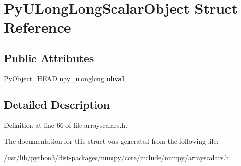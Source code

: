 \hypertarget{structPyULongLongScalarObject}{}\section{Py\+U\+Long\+Long\+Scalar\+Object Struct Reference}
\label{structPyULongLongScalarObject}
\subsection*{Public Attributes}
\begin{DoxyCompactItemize}
\item 
Py\+Object\+\_\+\+H\+E\+AD npy\+\_\+ulonglong {\bfseries obval}\hypertarget{structPyULongLongScalarObject_ae3f675eab855fcb593fee7bc9876d14f}{}\label{structPyULongLongScalarObject_ae3f675eab855fcb593fee7bc9876d14f}

\end{DoxyCompactItemize}


\subsection{Detailed Description}


Definition at line 66 of file arrayscalars.\+h.



The documentation for this struct was generated from the following file\+:\begin{DoxyCompactItemize}
\item 
/usr/lib/python3/dist-\/packages/numpy/core/include/numpy/arrayscalars.\+h\end{DoxyCompactItemize}
